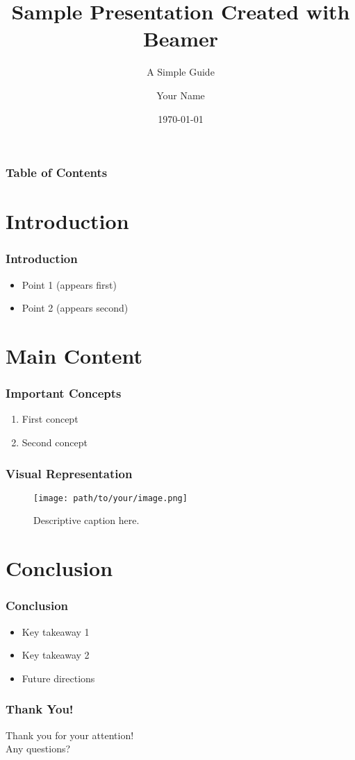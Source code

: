 \documentclass{beamer}
\title{Sample Presentation Created with Beamer}
\subtitle{A Simple Guide}
\author{Your Name}
\institute{Your Institution}
\date{\today}
\begin{document}
\begin{frame}
  \titlepage
\end{frame}

\begin{frame}
  \frametitle{Table of Contents}
  \tableofcontents
\end{frame}

\section{Introduction}

\begin{frame}
  \frametitle{Introduction}
  \begin{itemize}
    \item<1-> Point 1 (appears first)
    \item<2-> Point 2 (appears second)
  \end{itemize}
\end{frame}

\section{Main Content}

\begin{frame}
  \frametitle{Important Concepts}
  \begin{enumerate}
    \item First concept
    \item Second concept
  \end{enumerate}
\end{frame}

\begin{frame}
  \frametitle{Visual Representation}
  \begin{figure}
    \texttt{[image: path/to/your/image.png]}
    \caption{Descriptive caption here.}
  \end{figure}
\end{frame}

\section{Conclusion}

\begin{frame}
  \frametitle{Conclusion}
  \begin{itemize}
    \item Key takeaway 1
    \item Key takeaway 2
    \item Future directions
  \end{itemize}
\end{frame}

\begin{frame}
  \frametitle{Thank You!}
  \centering Thank you for your attention!\\
  Any questions?
\end{frame}
\end{document}
